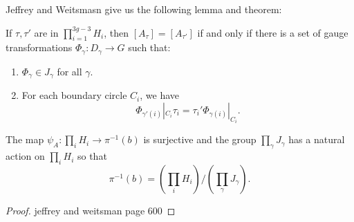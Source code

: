 	Jeffrey and Weitsmasn give us the following lemma and theorem:
	\begin{theorem}
		If $\tau,\tau'$ are in $\prod_{i=1}^{3g-3} H_i$, then $[A_\tau] = [A_{\tau'}]$ if and only if there is a set of gauge transformations $\Phi_\gamma:D_\gamma \to G$ such that:
		\begin{enumerate}
			\item $\Phi_\gamma \in J_\gamma$ for all $\gamma$.
			\item For each boundary circle $C_i$, we have
			$$
				\Phi_{\gamma'(i)}|_{C_i} \tau_i = \tau_i' \Phi_{\gamma(i)}|_{C_i}.
			$$
		\end{enumerate}
	\end{theorem} 
	\begin{theorem}
		The map $\psi_A:\prod_i H_i \to \pi^{-1}(b)$ is surjective and the group $\prod_\gamma J_\gamma$ has a natural action on $\prod_i H_i$ so that
		\begin{equation}
			\pi^{-1}(b) = \left(\prod_i H_i\right)/\left(\prod_\gamma J_\gamma\right).
		\end{equation}
	\end{theorem}
	\begin{proof}
		jeffrey and weitsman page 600
	\end{proof}

